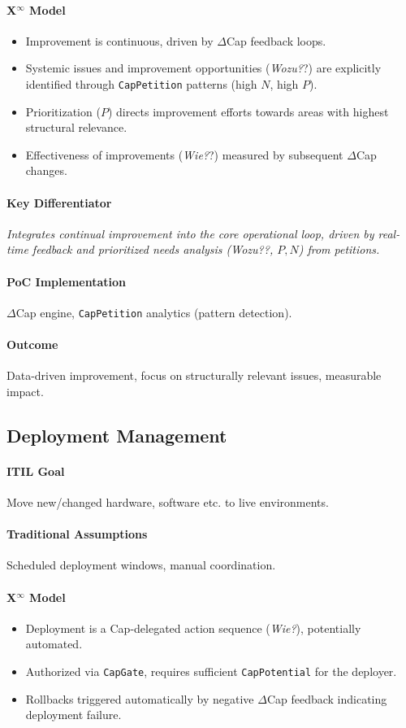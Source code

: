 \documentclass[12pt, a4paper]{scrartcl}
\newcommand{\Xinf}{X$^\infty$}                        %
\newcommand{\DeltaCap}{$\Delta$Cap}                    %
\newcommand{\CapPotential}{\texttt{CapPotential}}    %
\newcommand{\CapGate}{\texttt{CapGate}}
\newcommand{\CapPetition}{\texttt{CapPetition}}        %
\newcommand{\Wozu}{\textit{Wozu?}}                      %
\newcommand{\Wie}{\textit{Wie?}}                        %
\begin{document}
\paragraph*{\Xinf{} Model}
\begin{itemize}
    \item Improvement is continuous, driven by \DeltaCap{} feedback loops.
    \item Systemic issues and improvement opportunities (\Wozu?) are explicitly identified through \CapPetition{} patterns (high $N$, high $P$).
    \item Prioritization ($P$) directs improvement efforts towards areas with highest structural relevance.
    \item Effectiveness of improvements (\Wie?) measured by subsequent \DeltaCap{} changes.
\end{itemize}
\paragraph{Key Differentiator} \textit{Integrates continual improvement into the core operational loop, driven by real-time feedback and prioritized needs analysis (\Wozu?, $P,N$) from petitions.}
\paragraph{PoC Implementation} \DeltaCap{} engine, \CapPetition{} analytics (pattern detection).
\paragraph{Outcome} Data-driven improvement, focus on structurally relevant issues, measurable impact.

\subsection{Deployment Management} %
\paragraph{ITIL Goal} Move new/changed hardware, software etc. to live environments.
\paragraph{Traditional Assumptions} Scheduled deployment windows, manual coordination.
\paragraph*{\Xinf{} Model}
\begin{itemize}
    \item Deployment is a Cap-delegated action sequence (\Wie{}), potentially automated.
    \item Authorized via \CapGate{}, requires sufficient \CapPotential{} for the deployer.
    \item Rollbacks triggered automatically by negative \DeltaCap{} feedback indicating deployment failure.
\end{itemize}
\end{document}
